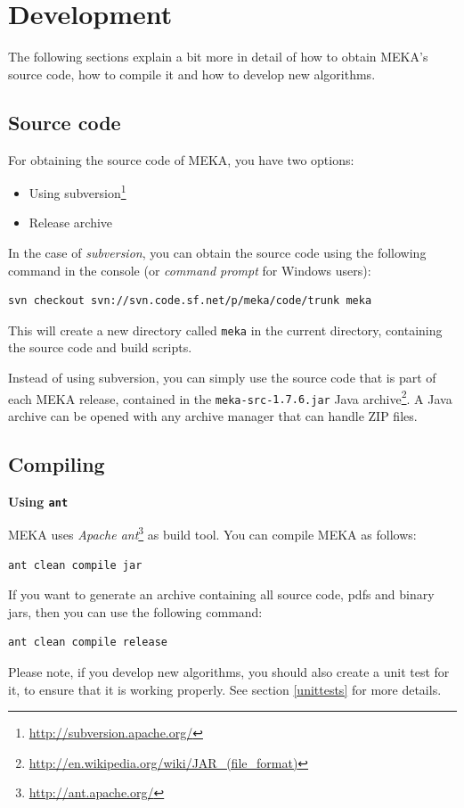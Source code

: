 \documentclass[11pt]{article}
\def\version{{\tt 1.7.6}}
\newcommand{\heading}[1]{
    \vspace{0.3cm} \noindent \textbf{#1} \newline
}
\begin{document}
\section{Development}
\label{development}
The following sections explain a bit more in detail of how to obtain MEKA's source code, how to compile it and how to develop new algorithms.

\subsection{Source code}
\label{sourcecode}
For obtaining the source code of MEKA, you have two options:
\begin{itemize}
  \item Using subversion\footnote{\url{http://subversion.apache.org/}}
  \item Release archive
\end{itemize}

\noindent In the case of \textit{subversion}, you can obtain the source code using the following command in the console (or \textit{command prompt} for Windows users):
\begin{lstlisting}
svn checkout svn://svn.code.sf.net/p/meka/code/trunk meka
\end{lstlisting}
This will create a new directory called \texttt{meka} in the current directory, containing the source code and build scripts.

Instead of using subversion, you can simply use the source code that is part of each MEKA release, contained in the \texttt{meka-src-\version.jar} Java archive\footnote{\url{http://en.wikipedia.org/wiki/JAR\_(file\_format)}}. A Java archive can be opened with any archive manager that can handle ZIP files.

\subsection{Compiling}
\label{compiling}
\heading{Using \texttt{ant}}
MEKA uses \textit{Apache ant}\footnote{\url{http://ant.apache.org/}} as build tool. You can compile MEKA as follows:
\begin{lstlisting}
ant clean compile jar
\end{lstlisting}
If you want to generate an archive containing all source code, pdfs and binary jars, then you can use the following command:
\begin{lstlisting}
ant clean compile release
\end{lstlisting}
Please note, if you develop new algorithms, you should also create a unit test for it, to ensure that it is working properly. See section \ref{unittests} for more details.
\end{document}
